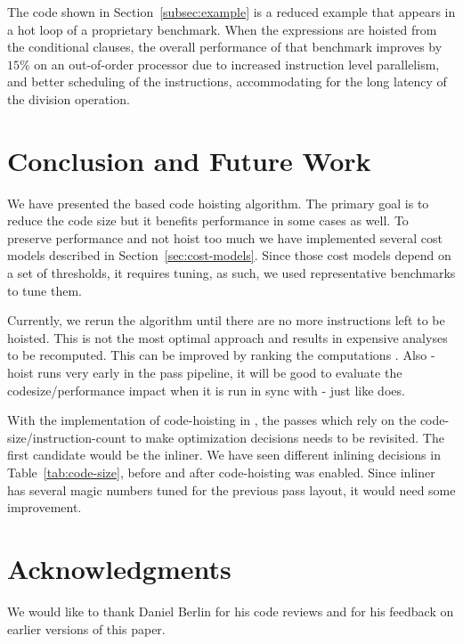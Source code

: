 \documentclass{sig-alternate}
\begin{document}
The code shown in Section~\ref{subsec:example} is a reduced example that appears
in a hot loop of a proprietary benchmark.  When the expressions are hoisted from
the conditional clauses, the overall performance of that benchmark improves by
$15\%$ on an out-of-order processor due to increased instruction level
parallelism, and better scheduling of the instructions, accommodating for the
long latency of the division operation.

\section{Conclusion and Future Work}
\label{sec:future-work}
We have presented the \GVN{} based code hoisting algorithm. The primary goal is to
reduce the code size but it benefits performance in some cases as well. To
preserve performance and not hoist too much we have implemented several cost
models described in Section~\ref{sec:cost-models}. Since those cost models
depend on a set of thresholds, it requires tuning, as such, we used
representative benchmarks to tune them.

Currently, we rerun the algorithm until there are no more instructions left to
be hoisted. This is not the most optimal approach and results in expensive
analyses to be recomputed. This can be improved by ranking the computations
\cite{rosen1988global}. Also \GVN{}-hoist runs very early in the pass pipeline, it
will be good to evaluate the codesize/performance impact when it is run in sync
with \GVN{}-\PRE{} just like \GCC{} does.

With the implementation of code-hoisting in \LLVM{}, the passes which rely on the
code-size/instruction-count to make optimization decisions needs to be
revisited. The first candidate would be the inliner. We have seen different
inlining decisions in Table~\ref{tab:code-size}, before and after
code-hoisting was enabled.  Since inliner has several magic numbers tuned for
the previous pass layout, it would need some improvement.

\section{Acknowledgments}
We would like to thank Daniel Berlin for his code reviews and for his feedback
on earlier versions of this paper.


{\small

}
\end{document}
